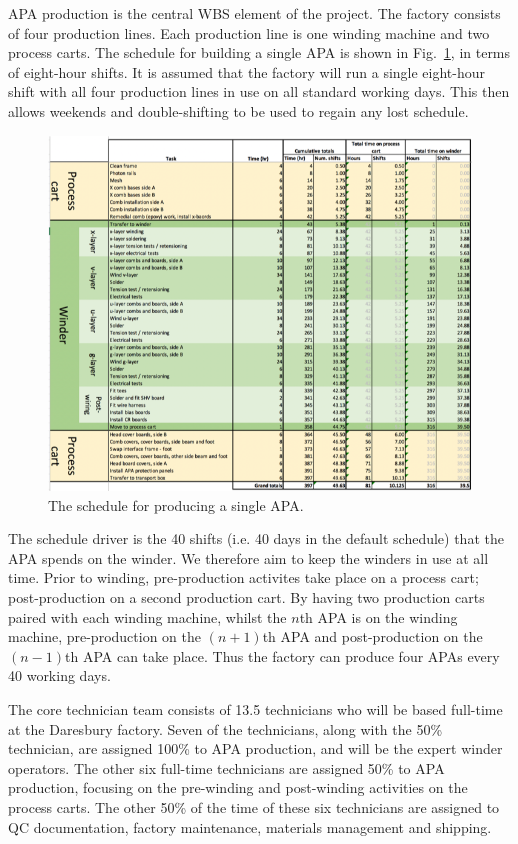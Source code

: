APA production is the central WBS element of the project. The factory consists of four production lines. Each production line is one winding machine and two process carts. The schedule for building a single APA is shown in Fig.~\ref{fig:FactorySchedule}, in terms of eight-hour shifts. It is assumed that the factory will run a single eight-hour shift with all four production lines in use on all standard working days. This then allows weekends and double-shifting to be used to regain any lost schedule.

\begin{figure}
    \centering
    \includegraphics[width=\textwidth]{figs/WP3/FactorySchedule.png}
    \caption{The schedule for producing a single APA.}
    \label{fig:FactorySchedule}
\end{figure}

The schedule driver is the 40 shifts (i.e. 40 days in the default schedule) that the APA spends on the winder. We therefore aim to keep the winders in use at all time. Prior to winding, pre-production activites take place on a process cart; post-production on a second production cart. By having two production carts paired with each winding machine, whilst the $n$th APA is on the winding machine, pre-production on the $(n+1)$th APA and post-production on the $(n-1)$th APA can take place. Thus the factory can produce four APAs every 40 working days.

The core technician team consists of 13.5 technicians who will be based full-time at the Daresbury factory. Seven of the technicians, along with the 50\% technician, are assigned 100\% to APA production, and will be the expert winder operators. The other six full-time technicians are assigned 50\% to APA production, focusing on the pre-winding and post-winding activities on the process carts. The other 50\% of the time of these six technicians are assigned to QC documentation, factory maintenance, materials management and shipping.

